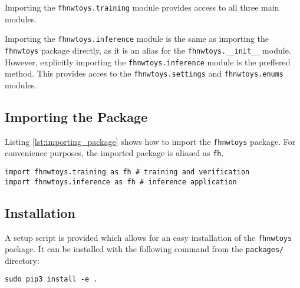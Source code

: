 Importing the \texttt{fhnwtoys.training} module provides access to all three main modules.

Importing the \texttt{fhnwtoys.inference} module is the same as importing the \texttt{fhnwtoys} package directly, as it is an alias for the \texttt{fhnwtoys.\_\_init\_\_} module.
However, explicitly importing the \texttt{fhnwtoys.inference} module is the preffered method.
This provides acces to the \texttt{fhnwtoys.settings} and \texttt{fhnwtoys.enums} modules.

\subsection{Importing the Package}
\label{subsec:inference:package:importing_the_package}
Listing \ref{lst:importing_package} shows how to import the \texttt{fhnwtoys} package.
For convenience purposes, the imported package is aliased as \texttt{fh}.

\begin{lstlisting}[style=python, caption={Importing the \texttt{fhnwtoys} Python package}, label=lst:importing_package]
import fhnwtoys.training as fh # training and verification
import fhnwtoys.inference as fh # inference application
\end{lstlisting}

\subsection{Installation}
\label{subsec:inference:package:installation}
A setup script is provided which allows for an easy installation of the \texttt{fhnwtoys} package.
It can be installed with the following command from the \texttt{packages/} directory:

\begin{lstlisting}[style=bash]
sudo pip3 install -e .
\end{lstlisting}
